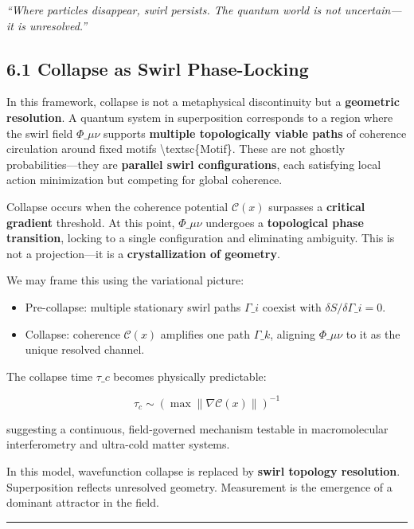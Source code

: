 \documentclass[
  11pt,
]{article}
\providecommand{\tightlist}{%
  \setlength{\itemsep}{0pt}\setlength{\parskip}{0pt}}
\begin{document}
\emph{``Where particles disappear, swirl persists. The quantum world is
not uncertain---it is unresolved.''}

\subsection{6.1 Collapse as Swirl
Phase-Locking}\label{collapse-as-swirl-phase-locking}

In this framework, collapse is not a metaphysical discontinuity but a
\textbf{geometric resolution}. A quantum system in superposition
corresponds to a region where the swirl field \(\Phi\_{\mu\nu}\)
supports \textbf{multiple topologically viable paths} of coherence
circulation around fixed motifs \textbackslash textsc\{Motif\}. These
are not ghostly probabilities---they are \textbf{parallel swirl
configurations}, each satisfying local action minimization but competing
for global coherence.

Collapse occurs when the coherence potential \(\mathcal{C}(x)\)
surpasses a \textbf{critical gradient} threshold. At this point,
\(\Phi\_{\mu\nu}\) undergoes a \textbf{topological phase transition},
locking to a single configuration and eliminating ambiguity. This is not
a projection---it is a \textbf{crystallization of geometry}.

We may frame this using the variational picture:

\begin{itemize}
\tightlist
\item
  Pre-collapse: multiple stationary swirl paths \({\Gamma\_i}\) coexist
  with \(\delta S / \delta \Gamma\_i = 0\).
\item
  Collapse: coherence \(\mathcal{C}(x)\) amplifies one path
  \(\Gamma\_k\), aligning \(\Phi\_{\mu\nu}\) to it as the unique
  resolved channel.
\end{itemize}

The collapse time \(\tau\_c\) becomes physically predictable:

\[
\tau_c \sim \left( \max \| \nabla \mathcal{C}(x) \| \right)^{-1}
\]

suggesting a continuous, field-governed mechanism testable in
macromolecular interferometry and ultra-cold matter systems.

In this model, wavefunction collapse is replaced by \textbf{swirl
topology resolution}. Superposition reflects unresolved geometry.
Measurement is the emergence of a dominant attractor in the field.

\begin{center}\rule{0.5\linewidth}{0.5pt}\end{center}
\end{document}
